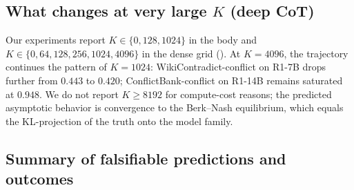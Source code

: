 \subsection{What changes at very large $K$ (deep CoT)}
\label{app:large-k}

Our experiments report $K\!\in\!\{0,128,1024\}$ in the body and
$K\!\in\!\{0,64,128,256,1024,4096\}$ in the dense grid
().  At $K\!=\!4096$, the trajectory continues
the pattern of $K\!=\!1024$: WikiContradict-conflict on R1-7B drops
further from $0.443$ to $0.420$; ConflictBank-conflict on R1-14B
remains saturated at $0.948$.  We do not report $K\!\geq\!8192$ for
compute-cost reasons; the predicted asymptotic behavior is convergence
to the Berk--Nash equilibrium, which equals the KL-projection of the
truth onto the model family.


\subsection{Summary of falsifiable predictions and outcomes}
\label{app:summary-predictions}

